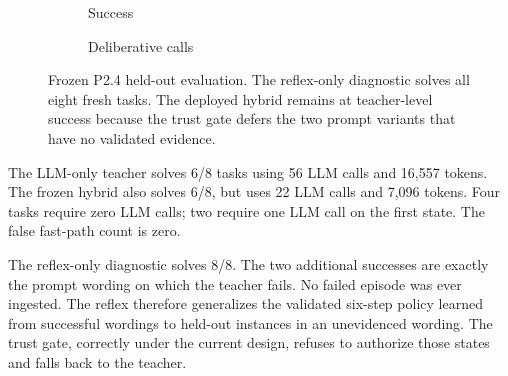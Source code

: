 \documentclass[10pt]{article}
\begin{document}
\begin{figure}[t]
\centering
\begin{subfigure}[b]{0.48\linewidth}
\centering
{}
\caption{Success}
\end{subfigure}\hfill
\begin{subfigure}[b]{0.48\linewidth}
\centering
{}
\caption{Deliberative calls}
\end{subfigure}
\caption{Frozen P2.4 held-out evaluation. The reflex-only diagnostic solves all eight fresh tasks. The deployed hybrid remains at teacher-level success because the trust gate defers the two prompt variants that have no validated evidence.}
\label{fig:frozen}
\end{figure}

The LLM-only teacher solves 6/8 tasks using 56 LLM calls and 16,557 tokens. The frozen hybrid also solves 6/8, but uses 22 LLM calls and 7,096 tokens. Four tasks require zero LLM calls; two require one LLM call on the first state. The false fast-path count is zero.

The reflex-only diagnostic solves 8/8. The two additional successes are exactly the prompt wording on which the teacher fails. No failed episode was ever ingested. The reflex therefore generalizes the validated six-step policy learned from successful wordings to held-out instances in an unevidenced wording. The trust gate, correctly under the current design, refuses to authorize those states and falls back to the teacher.
\end{document}
